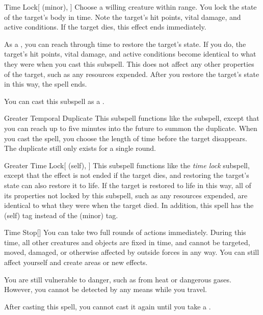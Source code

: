 \begin{ability}[\nth{4}]{Time Lock}[ (minor), ]
Choose a willing creature within \rngmed range.
You lock the state of the target's body in time.
Note the target's hit points, vital damage, and active conditions.
If the target dies, this effect ends immediately.

As a , you can reach through time to restore the target's state.
If you do, the target's hit points, vital damage, and active conditions become identical to what they were when you cast this subspell.
This does not affect any other properties of the target, such as any resources expended.
After you restore the target's state in this way, the spell ends.

You can cast this subspell as a .
\end{ability}
\vspace{0.25em}



\begin{ability}[\nth{7}]{Greater Temporal Duplicate}
This subspell functions like the  subspell, except that you can reach up to five minutes into the future to summon the duplicate.
When you cast the spell, you choose the length of time before the target disappears.
The duplicate still only exists for a single round.
\end{ability}
\vspace{0.25em}



\begin{ability}[\nth{7}]{Greater Time Lock}[ (self), ]
This subspell functions like the \textit{time lock} subspell, except that the effect is not ended if the target dies, and restoring the target's state can also restore it to life.
If the target is restored to life in this way, all of its properties not locked by this subspell, such as any resources expended, are identical to what they were when the target died.
In addition, this spell has the  (self) tag instead of the  (minor) tag.
\end{ability}
\vspace{0.25em}



\begin{ability}[\nth{7}]{Time Stop}[]
You can take two full rounds of actions immediately.
During this time, all other creatures and objects are fixed in time, and cannot be targeted, moved, damaged, or otherwise affected by outside forces in any way.
You can still affect yourself and create areas or new effects.

You are still vulnerable to danger, such as from heat or dangerous gases.
However, you cannot be detected by any means while you travel.

After casting this spell, you cannot cast it again until you take a .
\end{ability}
\vspace{0.25em}



